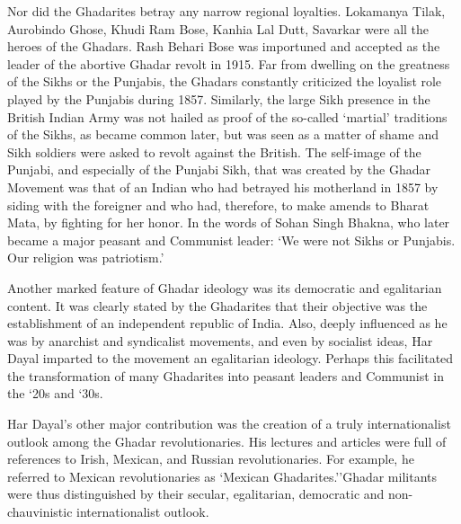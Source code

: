 Nor did the Ghadarites betray any narrow regional loyalties. Lokamanya Tilak, Aurobindo Ghose, Khudi Ram Bose, Kanhia Lal Dutt, Savarkar were all the heroes of the Ghadars. Rash Behari Bose was importuned and accepted as the leader of the abortive Ghadar revolt in 1915. Far from dwelling on the greatness of the Sikhs or the Punjabis, the Ghadars constantly criticized the loyalist role played by the Punjabis during 1857. Similarly, the large Sikh presence in the British Indian Army was not hailed as proof of the so-called `martial' traditions of the Sikhs, as became common later, but was seen as a matter of shame and Sikh soldiers were asked to revolt against the British. The self-image of the Punjabi, and especially of the Punjabi Sikh, that was created by the Ghadar Movement was that of an Indian who had betrayed his motherland in 1857 by siding with the foreigner and who had, therefore, to make amends to Bharat Mata, by fighting for her honor. In the words of Sohan Singh Bhakna, who later became a major peasant and Communist leader: `We were not Sikhs or Punjabis. Our religion was patriotism.'

Another marked feature of Ghadar ideology was its democratic and egalitarian content. It was clearly stated by the Ghadarites that their objective was the establishment of an independent republic of India. Also, deeply influenced as he was by anarchist and syndicalist movements, and even by socialist ideas, Har Dayal imparted to the movement an egalitarian ideology. Perhaps this facilitated the transformation of many Ghadarites into peasant leaders and Communist in the `20s and `30s.

Har Dayal's other major contribution was the creation of a truly internationalist outlook among the Ghadar revolutionaries. His lectures and articles were full of references to Irish, Mexican, and Russian revolutionaries. For example, he referred to Mexican revolutionaries as `Mexican Ghadarites.''Ghadar militants were thus distinguished by their secular, egalitarian, democratic and non-chauvinistic internationalist outlook.

